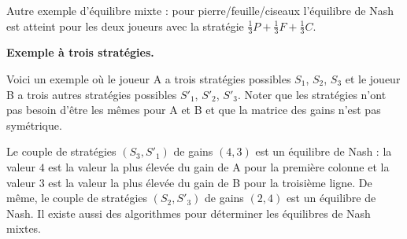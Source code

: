 \documentclass[11pt,class=report,crop=false]{standalone}
\begin{document}
Autre exemple d'équilibre mixte : pour \og{}pierre/feuille/ciseaux\fg{} l'équilibre de Nash est atteint pour les deux joueurs avec la stratégie $\frac13P+\frac13F+\frac13C$.




\bigskip
\textbf{Exemple à trois stratégies.}

Voici un exemple où le joueur A a trois stratégies possibles $S_1$, $S_2$, $S_3$ et le joueur B a trois autres stratégies possibles $S'_1$, $S'_2$, $S'_3$. Noter que les stratégies n'ont pas besoin d'être les mêmes pour A et B et que la matrice des gains n'est pas symétrique. 


Le couple de stratégies $(S_3,S'_1)$ de gains $(4,3)$ est un équilibre de Nash : la valeur $4$ est la valeur la plus élevée du gain de A pour la première colonne et la valeur $3$ est la valeur  la plus élevée du gain de B pour la troisième ligne.
De même, le couple de stratégies $(S_2,S'_3)$ de gains $(2,4)$ est un équilibre de Nash.
Il existe aussi des algorithmes pour déterminer les équilibres de Nash mixtes.
\end{document}
